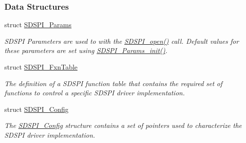 \subsubsection*{Data Structures}
\begin{DoxyCompactItemize}
\item 
struct \hyperlink{struct_s_d_s_p_i___params}{S\-D\-S\-P\-I\-\_\-\-Params}
\begin{DoxyCompactList}\small\item\em S\-D\-S\-P\-I Parameters are used to with the \hyperlink{_s_d_s_p_i_8h_af4a5ca9bb35e8a7df02acf20ceeae66d}{S\-D\-S\-P\-I\-\_\-open()} call. Default values for these parameters are set using \hyperlink{_s_d_s_p_i_8h_a6fe24eaba1cca88242c5df360a074ca8}{S\-D\-S\-P\-I\-\_\-\-Params\-\_\-init()}. \end{DoxyCompactList}\item 
struct \hyperlink{struct_s_d_s_p_i___fxn_table}{S\-D\-S\-P\-I\-\_\-\-Fxn\-Table}
\begin{DoxyCompactList}\small\item\em The definition of a S\-D\-S\-P\-I function table that contains the required set of functions to control a specific S\-D\-S\-P\-I driver implementation. \end{DoxyCompactList}\item 
struct \hyperlink{struct_s_d_s_p_i___config}{S\-D\-S\-P\-I\-\_\-\-Config}
\begin{DoxyCompactList}\small\item\em The \hyperlink{struct_s_d_s_p_i___config}{S\-D\-S\-P\-I\-\_\-\-Config} structure contains a set of pointers used to characterize the S\-D\-S\-P\-I driver implementation. \end{DoxyCompactList}\end{DoxyCompactItemize}
